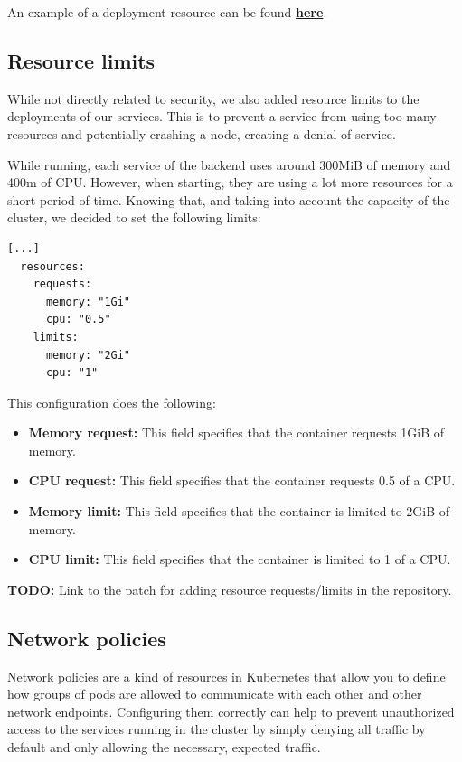\documentclass[12pt,x11names]{article}
\begin{document}
\medskip
An example of a deployment resource can be found \href{https://github.com/thomas-mauran/LinkedOut/blob/main/kube/base/api_gateway/deployment.yml}{\textbf{here}}.

\subsection{Resource limits}

While not directly related to security, we also added resource limits to the deployments
of our services. This is to prevent a service from using too many resources and potentially
crashing a node, creating a denial of service.

\medskip
While running, each service of the backend uses around 300MiB of memory and 400m of CPU. However,
when starting, they are using a lot more resources for a short period of time. Knowing that,
and taking into account the capacity of the cluster, we decided to set the following limits:

\begin{lstlisting}
[...]
  resources:
    requests:
      memory: "1Gi"
      cpu: "0.5"
    limits:
      memory: "2Gi"
      cpu: "1"
\end{lstlisting}

This configuration does the following:

\begin{itemize}
  \item \textbf{Memory request:} This field specifies that the container requests 1GiB of
  memory.
  \item \textbf{CPU request:} This field specifies that the container requests 0.5 of a CPU.
  \item \textbf{Memory limit:} This field specifies that the container is limited to 2GiB of
  memory.
  \item \textbf{CPU limit:} This field specifies that the container is limited to 1 of a CPU.
\end{itemize}

\medskip
\textbf{TODO:} Link to the patch for adding resource requests/limits in the repository.

\subsection{Network policies}

Network policies are a kind of resources in Kubernetes that allow you to define how groups
of pods are allowed to communicate with each other and other network endpoints. Configuring
them correctly can help to prevent unauthorized access to the services running in the cluster
by simply denying all traffic by default and only allowing the necessary, expected traffic.
\end{document}
